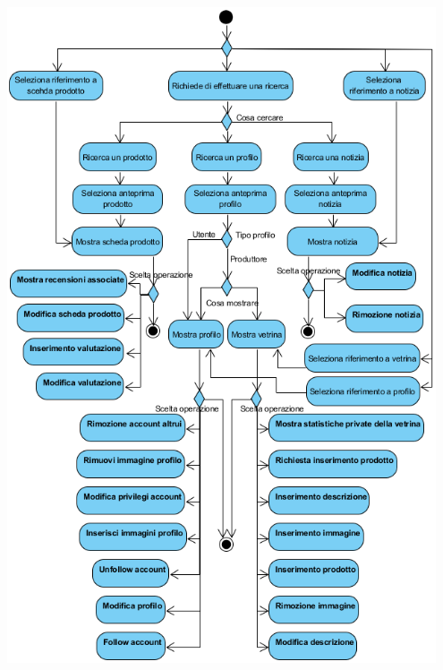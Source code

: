 \begin{center}
	\includegraphics[width=0.95\textwidth]{assets/visualParadigm/attivita/ricerche}
\end{center}


